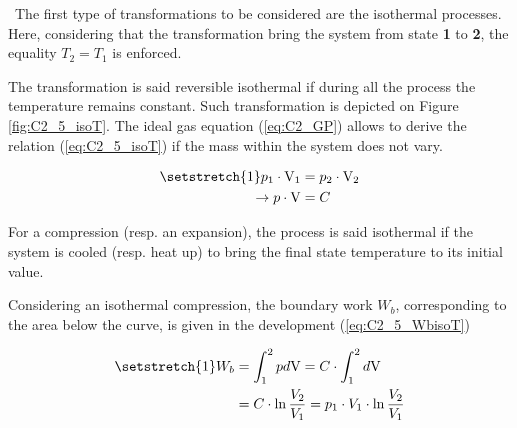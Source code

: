 \quad\ The first type of transformations to be considered are the isothermal processes. Here, considering that the transformation bring the system from state \textbf{1} to \textbf{2}, the equality \(T_2 = T_1\)  is enforced. 

The transformation is said reversible isothermal if during all the process the temperature remains constant. Such transformation is depicted on Figure \ref{fig:C2_5_isoT}. The ideal gas equation (\ref{eq:C2_GP}) allows to derive the relation (\ref{eq:C2_5_isoT}) if the mass within the system does not vary.

  \begin{align}
    \setstretch{1}
    p_1\cdot \mathrm{V}_1 &= p_2\cdot \mathrm{V}_2\nonumber\\
    \rightarrow p\cdot \mathrm{V} &= C \label{eq:C2_5_isoT}  
  \end{align}

 For a compression (resp. an expansion), the process is said isothermal if the system is cooled (resp. heat up) to bring the final state temperature to its initial value.

Considering an isothermal compression, the boundary work $W_b$, corresponding to the area below the curve, is given in the development (\ref{eq:C2_5_WbisoT})

\begin{align}
  \setstretch{1}
  W_b &= \int_1^2 pd\mathrm{V} = C\cdot\int_1^2d\mathrm{V}\nonumber\\
  &= C\cdot \ln \frac{V_2}{V_1} = p_1\cdot V_1\cdot \ln \frac{V_2}{V_1} \label{eq:C2_5_WbisoT}
\end{align}

